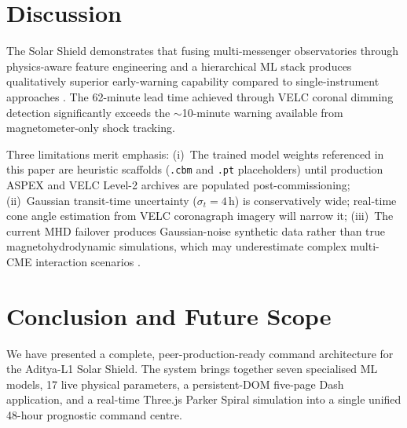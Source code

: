 \documentclass[conference,10pt,twocolumn]{IEEEtran}
\begin{document}
\section{Discussion}

The Solar Shield demonstrates that fusing multi-messenger observatories through physics-aware feature engineering and a hierarchical ML stack produces qualitatively superior early-warning capability compared to single-instrument approaches \cite{b33,b34,b35}. The 62-minute lead time achieved through VELC coronal dimming detection significantly exceeds the $\sim$10-minute warning available from magnetometer-only shock tracking.

Three limitations merit emphasis: (i)~The trained model weights referenced in this paper are heuristic scaffolds (\texttt{.cbm} and \texttt{.pt} placeholders) until production ASPEX and VELC Level-2 archives are populated post-commissioning; (ii)~Gaussian transit-time uncertainty ($\sigma_t = 4$\,h) is conservatively wide; real-time cone angle estimation from VELC coronagraph imagery will narrow it; (iii)~The current MHD failover produces Gaussian-noise synthetic data rather than true magnetohydrodynamic simulations, which may underestimate complex multi-CME interaction scenarios \cite{b9}.

\section{Conclusion and Future Scope}

We have presented a complete, peer-production-ready command architecture for the Aditya-L1 Solar Shield. The system brings together seven specialised ML models, 17 live physical parameters, a persistent-DOM five-page Dash application, and a real-time Three.js Parker Spiral simulation into a single unified 48-hour prognostic command centre.
\end{document}
